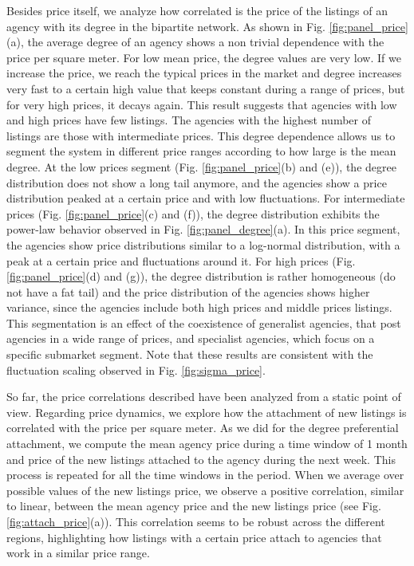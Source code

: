 Besides price itself, we analyze how correlated is the price of the listings of an agency with its degree in the bipartite network. As shown in Fig. \ref{fig:panel_price}(a), the average degree of an agency shows a non trivial dependence with the price per square meter. For low mean price, the degree values are very low. If we increase the price, we reach the typical prices in the market and degree increases very fast to a certain high value that keeps constant during a range of prices, but for very high prices, it decays again. This result suggests that agencies with low and high prices have few listings. The agencies with the highest number of listings are those with intermediate prices. This degree dependence allows us to segment the system in different price ranges according to how large is the mean degree. At the low prices segment (Fig. \ref{fig:panel_price}(b) and (e)), the degree distribution does not show a long tail anymore, and the agencies show a price distribution peaked at a certain price and with low fluctuations. For intermediate prices (Fig. \ref{fig:panel_price}(c) and  (f)), the degree distribution exhibits the power-law behavior observed in Fig. \ref{fig:panel_degree}(a). In this price segment, the agencies show price distributions similar to a log-normal distribution, with a peak at a certain price and fluctuations around it. For high prices (Fig. \ref{fig:panel_price}(d) and (g)), the degree distribution is rather homogeneous (do not have a fat tail) and the price distribution of the agencies shows higher variance, since the agencies include both high prices and middle prices listings. This segmentation is an effect of the coexistence of generalist agencies, that post agencies in a wide range of prices, and specialist agencies, which focus on a specific submarket segment. Note that these results are consistent with the fluctuation scaling observed in Fig. \ref{fig:sigma_price}. 

So far, the price correlations described have been analyzed from a static point of view. Regarding price dynamics, we explore how the attachment of new listings is correlated with the price per square meter. As we did for the degree preferential attachment, we compute the mean agency price during a time window of 1 month and price of the new listings attached to the agency during the next week. This process is repeated for all the time windows in the period. When we average over possible values of the new listings price, we observe a positive correlation, similar to linear, between the mean agency price and the new listings price (see Fig. \ref{fig:attach_price}(a)). This correlation seems to be robust across the different regions, highlighting how listings with a certain price attach to agencies that work in a similar price range.


